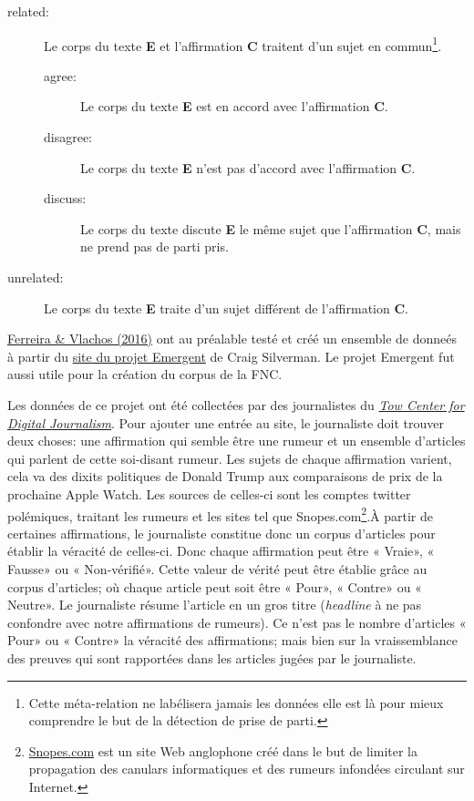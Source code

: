 \documentclass[11pt,a4paper,oldfontcommands]{memoir}
\begin{document}
\begin{description}
 \item [related:] Le corps du texte \textbf{E} et l'affirmation \textbf{C} traitent d'un sujet en commun\footnote{Cette méta-relation ne labélisera jamais les données elle est là pour mieux comprendre le but de la détection de prise de parti.}.
       \begin{description}
        \item [agree:] Le corps du texte \textbf{E} est en accord avec l'affirmation \textbf{C}.
        \item [disagree:] Le corps du texte \textbf{E} n'est pas d'accord avec l'affirmation \textbf{C}.
        \item [discuss:] Le corps du texte discute \textbf{E} le même sujet que l'affirmation \textbf{C}, mais ne prend pas de parti pris.
       \end{description}
 \item [unrelated:] Le corps du texte \textbf{E} traite d'un sujet différent de l'affirmation \textbf{C}.
\end{description}

\href{http://aclweb.org/anthology/N/N16/N16-1138.pdf}{Ferreira \& Vlachos (2016)} ont au préalable testé et créé un ensemble de donneés à partir du \href{http://www.emergent.info/}{site du projet Emergent} de Craig Silverman.
Le projet Emergent fut aussi utile pour la création du corpus de la FNC.

Les données de ce projet ont été collectées par des journalistes du \href{https://towcenter.org/}{\textit{Tow Center for Digital Journalism}}.
Pour ajouter une entrée au site, le journaliste doit trouver deux choses: une affirmation qui semble être une rumeur et un ensemble d'articles qui parlent de cette soi-disant rumeur.
Les sujets de chaque affirmation varient, cela va des dixits politiques de Donald Trump aux comparaisons de prix de la prochaine Apple Watch.
Les sources de celles-ci sont les comptes twitter polémiques, traitant les rumeurs et les sites tel que Snopes.com\footnote{\href{https://www.snopes.com/}{Snopes.com} est un site Web anglophone créé dans le but de limiter la propagation des canulars informatiques et des rumeurs infondées circulant sur Internet.}.À partir de certaines affirmations, le journaliste constitue donc un corpus d'articles pour établir la véracité de celles-ci.
Donc chaque affirmation peut être « Vraie», « Fausse» ou « Non-vérifié».
Cette valeur de vérité peut être établie grâce au corpus d'articles; où chaque article peut soit être « Pour», « Contre» ou « Neutre».
Le journaliste résume l'article en un gros titre (\textit{headline} à ne pas confondre avec notre affirmations de rumeurs).
Ce n'est pas le nombre d'articles « Pour»  ou « Contre» la véracité des affirmations; mais bien sur la vraissemblance des preuves qui sont rapportées dans les articles jugées par le journaliste.
\end{document}
